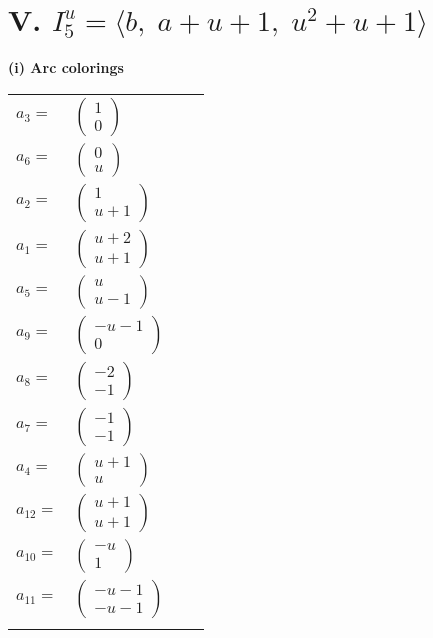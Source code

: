 \documentclass[1p]{elsarticle_modified}
\theoremstyle{definition}
\begin{document}
\centering \section*{V. $I^u_{5}= \langle b,\;a+u+1,\;u^2+u+1 \rangle$}
\flushleft \textbf{(i) Arc colorings}\\
\begin{tabular}{m{7pt} m{180pt} m{7pt} m{180pt} }
\flushright $a_{3}=$&$\begin{pmatrix}1\\0\end{pmatrix}$ \\
\flushright $a_{6}=$&$\begin{pmatrix}0\\u\end{pmatrix}$ \\
\flushright $a_{2}=$&$\begin{pmatrix}1\\u+1\end{pmatrix}$ \\
\flushright $a_{1}=$&$\begin{pmatrix}u+2\\u+1\end{pmatrix}$ \\
\flushright $a_{5}=$&$\begin{pmatrix}u\\u-1\end{pmatrix}$ \\
\flushright $a_{9}=$&$\begin{pmatrix}- u-1\\0\end{pmatrix}$ \\
\flushright $a_{8}=$&$\begin{pmatrix}-2\\-1\end{pmatrix}$ \\
\flushright $a_{7}=$&$\begin{pmatrix}-1\\-1\end{pmatrix}$ \\
\flushright $a_{4}=$&$\begin{pmatrix}u+1\\u\end{pmatrix}$ \\
\flushright $a_{12}=$&$\begin{pmatrix}u+1\\u+1\end{pmatrix}$ \\
\flushright $a_{10}=$&$\begin{pmatrix}- u\\1\end{pmatrix}$ \\
\flushright $a_{11}=$&$\begin{pmatrix}- u-1\\- u-1\end{pmatrix}$\\&\end{tabular}
\end{document}
